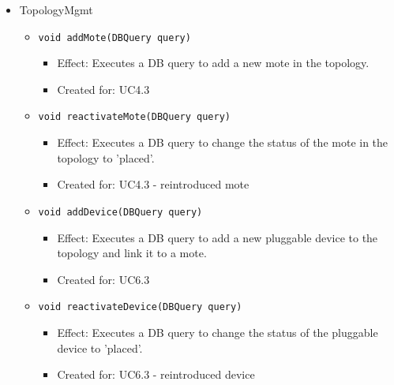 \begin{itemize}
        	\item TopologyMgmt
        	\begin{itemize}
        		\item \texttt{void addMote(DBQuery query)}
        		\begin{itemize}
                    \item Effect: Executes a DB query to add a new mote in the topology.
        			\item Created for: UC4.3
        		\end{itemize}
                \item \texttt{void reactivateMote(DBQuery query)}
                    \begin{itemize}
                        \item Effect: Executes a DB query to change the status of the mote in the topology to 'placed'.
                        \item Created for: UC4.3 - reintroduced mote
                    \end{itemize}
                \item \texttt{void addDevice(DBQuery query)}
                    \begin{itemize}
                        \item Effect: Executes a DB query to add a new pluggable device to the topology and link it to a mote.
                        \item Created for: UC6.3
                    \end{itemize}
                \item \texttt{void reactivateDevice(DBQuery query)}
                    \begin{itemize}
                        \item Effect: Executes a DB query to change the status of the pluggable device to 'placed'.
                        \item Created for: UC6.3 - reintroduced device
                    \end{itemize}
        	\end{itemize}
        \end{itemize}


